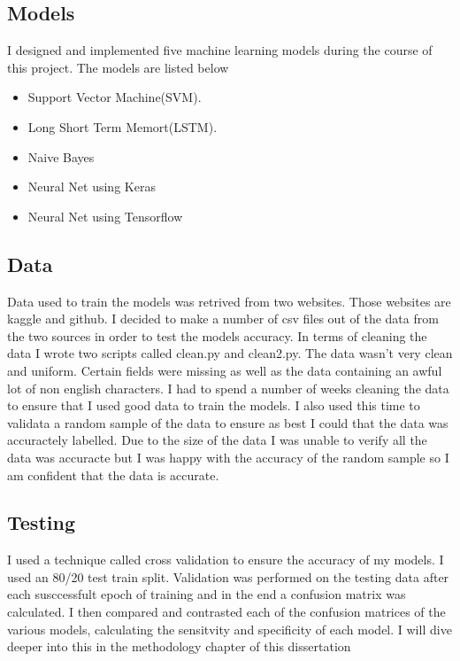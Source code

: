 \subsection{Models}
I designed and implemented five machine learning models during the course of this project. The models are listed below 
\begin{itemize}
	\item Support Vector Machine(SVM).
	\item Long Short Term Memort(LSTM).
	\item Naive Bayes 
	\item Neural Net using Keras
	\item Neural Net using Tensorflow
\end{itemize}

\subsection{Data}
Data used to train the models was retrived from two websites. Those websites are kaggle and github. I decided to make a number of csv files out of the data from the two sources in order to test the models accuracy. In terms of cleaning the data I wrote two scripts called clean.py and clean2.py. The data wasn't very clean and uniform. Certain fields were missing as well as the data containing an awful lot of non english characters. I had to spend a number of weeks cleaning the data to ensure that I used good data to train the models. I also used this time to validata a random sample of the data to ensure as best I could that the data was accuractely labelled. Due to the size of the data I was unable to verify all the data was accuracte but I was happy with the accuracy of the random sample so I am confident that the data is accurate.
\subsection{Testing}
I used a technique called cross validation to ensure the accuracy of my models. I used an 80/20 test train split. Validation was performed on the testing data after each susccessfult epoch of training and in the end a confusion matrix was calculated. I then compared and contrasted each of the confusion matrices of the various models, calculating the sensitvity and specificity of each model. I will dive deeper into this in the methodology chapter of this dissertation

